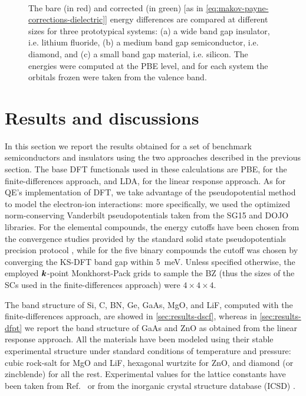 \begin{figure}
    \centering
     \\
    \caption[Convergence finite-size corrections for the finite-differences method]{The bare (in red) and corrected (in green) [as in \cref{eq:makov-payne-corrections-dielectric}] energy differences are compared at different sizes for three prototypical systems: (a) a wide band gap insulator, i.e. lithium fluoride, (b) a medium band gap semiconductor, i.e. diamond, and (c) a small band gap material, i.e. silicon. The energies were computed at the PBE level, and for each system the orbitals frozen were taken from the valence band.}
    \label{fig:convergence-makov-payne}
\end{figure}

\section{Results and discussions\label{sec:results-bands}}
In this section we report the results obtained for a set of benchmark semiconductors and insulators using the two approaches described in the previous section. The base DFT functionals used in these calculations are PBE, for the finite-differences approach, and LDA, for the linear response approach. As for QE's implementation of DFT, we take advantage of the pseudopotential method to model the electron-ion interactions: more specifically, we used the optimized norm-conserving Vanderbilt pseudopotentials \cite{hamann_optimized_2013,hamann_erratum_2017} taken from the SG15 \cite{schlipf_optimization_2015} and DOJO \cite{van_setten_pseudodojo_2018} libraries. For the elemental compounds, the energy cutoffs have been chosen from the convergence studies provided by the standard solid state pseudopotentials precision protocol \cite{prandini_precision_2018}, while for the five binary compounds the cutoff was chosen by converging the KS-DFT band gap within 5~\si{\milli\electronvolt}. Unless specified otherwise, the employed ${\bm k}$-point Monkhorst-Pack grids to sample the BZ (thus the sizes of the SCs used in the finite-differences approach) were $4\times 4\times 4$.

The band structure of Si, C, BN, Ge, GaAs, MgO, and LiF, computed with the finite-differences approach, are showed in \cref{sec:results-dscf}, whereas in \cref{sec:results-dfpt} we report the band structure of GaAs and ZnO as obtained from the linear response approach. All the materials have been modeled using their stable experimental structure under standard conditions of temperature and pressure: cubic rock-salt for MgO and LiF, hexagonal wurtzite for ZnO, and diamond (or zincblende) for all the rest. Experimental values for the lattice constants have been taken from Ref.~\cite{madelung_semiconductors_2004} or from the inorganic crystal structure database (ICSD) \cite{icsd_website}.

